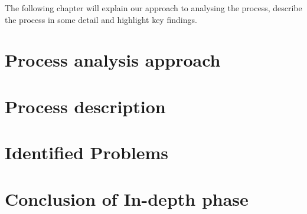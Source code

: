 The following chapter will explain our approach to analysing the process, describe the process in some detail and highlight key findings.

\section{Process analysis approach}

\section{Process description}

\section{Identified Problems}

\section{Conclusion of In-depth phase}
